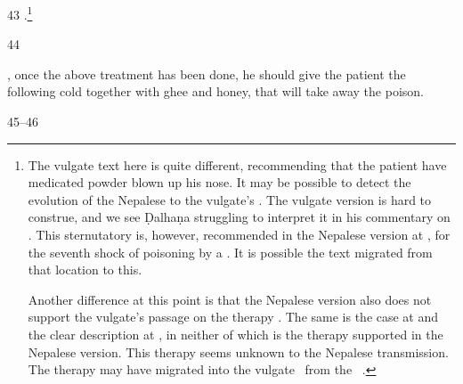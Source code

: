 \begin{translation}
   
    \item[43] .\footnote{The
    vulgate text here is quite different, recommending that the
    patient have medicated powder blown up his nose. It may be
    possible to detect the evolution of the Nepalese  to
    the vulgate's .  The vulgate version is hard to
    construe, and we see Ḍalhaṇa struggling to interpret it in his
    commentary on .  This sternutatory is, however,
    recommended in the Nepalese version at , for the
    seventh shock of poisoning by a .  It
    is possible the text migrated from  that location to this.

\label{kakapada} Another difference at this point is that the Nepalese
version also does not support the vulgate's passage on the
 therapy \citep[145, n.\,106]{wuja-2003}.  The
same is the case at  and the clear description at
, in neither of which is the therapy supported in the
Nepalese version.  This therapy seems unknown to the Nepalese
transmission.  The therapy may have migrated into the vulgate \SS\ from
the \CS\ .}
    

%

\item[44] 

, once the above treatment has been
done, he should give the patient the following cold  together
with ghee and honey, that will take away the poison.
       
    \item[45--46]
    

\end{translation}
